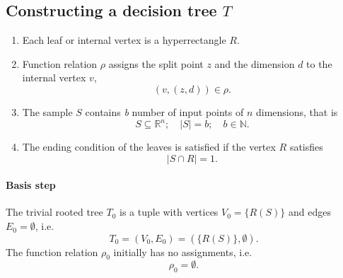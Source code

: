 \subsection{Constructing a decision tree $T$}
\label{sec:cdt}
\begin{enumerate}

    \item Each leaf or internal vertex is a hyperrectangle $R$. 
    \item Function relation $\rho$ assigns the split point $z$ and the dimension $d$ to the internal vertex $v$,
    $$(v, (z,d)) \in \rho.$$
    \item The sample \(S\) contains \emph{b} number of input points of $n$ dimensions, that is
    $$S \subseteq \mathbb{R}^n ;\quad |S| = b; \quad b \in \mathbb{N}.$$
    \item The ending condition of the leaves is satisfied if the vertex \(R\) satisfies \[| S \cap R | = 1.\]
\end{enumerate}


\paragraph{Basis step}
The trivial rooted tree \(T_0\) is a tuple with
vertices \(V_0 = \{R(S)\}\) and edges \(E_0 = \emptyset\), i.e. 
\[T_0= (V_0, E_0) = (\{R(S)\},\emptyset).\]
The function relation $\rho_0$ initially has no assignments, i.e.
$$\rho_0 = \emptyset.$$

